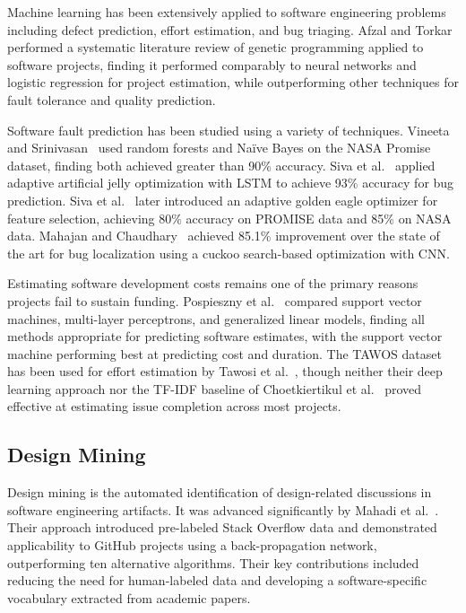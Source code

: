 \documentclass[preprint,12pt]{elsarticle}
\begin{document}
Machine learning has been extensively applied to software engineering problems including defect prediction, effort estimation, and bug triaging. Afzal and Torkar~\cite{afzal2011} performed a systematic literature review of genetic programming applied to software projects, finding it performed comparably to neural networks and logistic regression for project estimation, while outperforming other techniques for fault tolerance and quality prediction.

Software fault prediction has been studied using a variety of techniques. Vineeta and Srinivasan~\cite{vineeta2019} used random forests and Na\"ive Bayes on the NASA Promise dataset, finding both achieved greater than 90\% accuracy. Siva et al.~\cite{siva2023a} applied adaptive artificial jelly optimization with LSTM to achieve 93\% accuracy for bug prediction.  Siva et al.~\cite{siva2023b} later introduced an adaptive golden eagle optimizer for feature selection, achieving 80\% accuracy on PROMISE data and 85\% on NASA data. Mahajan and Chaudhary~\cite{mahajan2022} achieved 85.1\% improvement over the state of the art for bug localization using a cuckoo search-based optimization with CNN.

Estimating software development costs remains one of the primary reasons projects fail to sustain funding. Pospieszny et al.~\cite{pospieszny2018} compared support vector machines, multi-layer perceptrons, and generalized linear models, finding all methods appropriate for predicting software estimates, with the support vector machine performing best at predicting cost and duration. The TAWOS dataset has been used for effort estimation by Tawosi et al.~\cite{tawosi2022}, though neither their deep learning approach nor the TF-IDF baseline of Choetkiertikul et al.~\cite{choetkiertikul2019} proved effective at estimating issue completion across most projects.

\subsection{Design Mining}

Design mining is the automated identification of design-related discussions in software engineering artifacts. It was advanced significantly by Mahadi et al.~\cite{mahadi2021}. Their approach introduced pre-labeled Stack Overflow data and demonstrated applicability to GitHub projects using a back-propagation network, outperforming ten alternative algorithms. Their key contributions included reducing the need for human-labeled data and developing a software-specific vocabulary extracted from academic papers.
\end{document}

